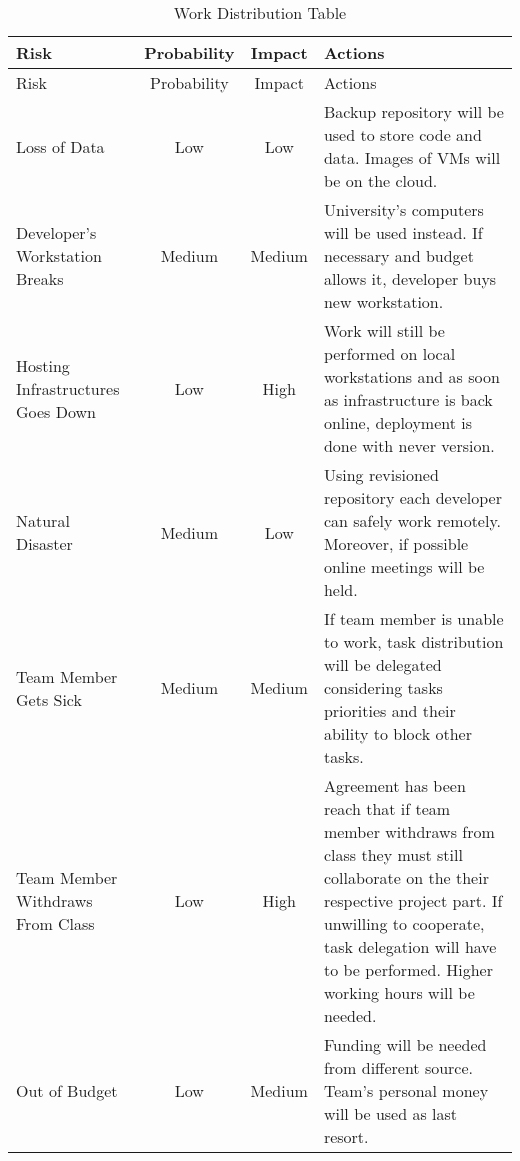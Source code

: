 \begin{center}
\setlength{\extrarowheight}{1.5pt}
    \begin{longtable}{|m{5cm}|c|c|m{7cm}|}
 \caption{Work Distribution Table} \\
     \hline
    
    \centering  Risk & Probability & Impact & Actions \\
    \hline \hline \endfirsthead
    
         \hline

	\centering  Risk & Probability & Impact & Actions \\    
	\hline \hline \endhead
    
    \endfoot  
Loss of Data    & Low           & Low      & Backup repository will be used to store code and data. Images of VMs will be on the cloud.       \\ \hline
Developer's Workstation Breaks  & Medium           & Medium      & University's computers will be used instead. If necessary and budget allows it, developer buys new workstation.       \\  \hline
    Hosting Infrastructures Goes Down    & Low           & High      & Work will still be performed on local workstations and as soon as infrastructure is back online, deployment is done with never version.       \\  \hline
    Natural Disaster    & Medium           & Low      & Using revisioned repository each developer can safely work remotely. Moreover, if possible online meetings will be held.       \\  \hline
    Team Member Gets Sick    & Medium           & Medium      & If team member is unable to work, task distribution will be delegated considering tasks priorities and their ability to block other tasks.       \\  \hline
    Team Member Withdraws From Class   & Low           & High      & Agreement has been reach that if team member withdraws from class they must still collaborate on the their respective project part. If unwilling to cooperate, task delegation will have to be performed. Higher working hours will be needed.       \\  \hline
    Out of Budget    & Low           & Medium      & Funding will be needed from different source. Team's personal money will be used as last resort.       \\  \hline
\end{longtable}
\end{center}
